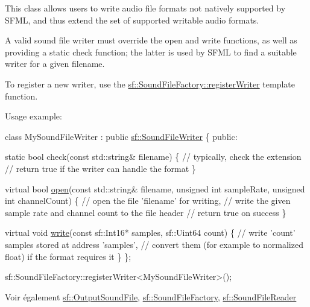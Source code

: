 This class allows users to write audio file formats not natively supported by S\+F\+ML, and thus extend the set of supported writable audio formats.

A valid sound file writer must override the open and write functions, as well as providing a static check function; the latter is used by S\+F\+ML to find a suitable writer for a given filename.

To register a new writer, use the \hyperlink{classsf_1_1SoundFileFactory_a3a59140e6ccf1f252f721b790eddd661}{sf\+::\+Sound\+File\+Factory\+::register\+Writer} template function.

Usage example\+: 
\begin{DoxyCode}
\textcolor{keyword}{class }MySoundFileWriter : \textcolor{keyword}{public} \hyperlink{classsf_1_1SoundFileWriter}{sf::SoundFileWriter}
\{
\textcolor{keyword}{public}:

    \textcolor{keyword}{static} \textcolor{keywordtype}{bool} check(\textcolor{keyword}{const} std::string& filename)
    \{
        \textcolor{comment}{// typically, check the extension}
        \textcolor{comment}{// return true if the writer can handle the format}
    \}

    \textcolor{keyword}{virtual} \textcolor{keywordtype}{bool} \hyperlink{classsf_1_1SoundFileWriter_a5c92bcaaa880ef4d3eaab18dae1d3d07}{open}(\textcolor{keyword}{const} std::string& filename, \textcolor{keywordtype}{unsigned} \textcolor{keywordtype}{int} sampleRate, \textcolor{keywordtype}{unsigned} \textcolor{keywordtype}{int} channelCount)
    \{
        \textcolor{comment}{// open the file 'filename' for writing,}
        \textcolor{comment}{// write the given sample rate and channel count to the file header}
        \textcolor{comment}{// return true on success}
    \}

    \textcolor{keyword}{virtual} \textcolor{keywordtype}{void} \hyperlink{classsf_1_1SoundFileWriter_a4ce597e7682d22c5b2c98d77e931a1da}{write}(\textcolor{keyword}{const} sf::Int16* samples, sf::Uint64 count)
    \{
        \textcolor{comment}{// write 'count' samples stored at address 'samples',}
        \textcolor{comment}{// convert them (for example to normalized float) if the format requires it}
    \}
\};

sf::SoundFileFactory::registerWriter<MySoundFileWriter>();
\end{DoxyCode}


\begin{DoxySeeAlso}{Voir également}
\hyperlink{classsf_1_1OutputSoundFile}{sf\+::\+Output\+Sound\+File}, \hyperlink{classsf_1_1SoundFileFactory}{sf\+::\+Sound\+File\+Factory}, \hyperlink{classsf_1_1SoundFileReader}{sf\+::\+Sound\+File\+Reader} 
\end{DoxySeeAlso}


